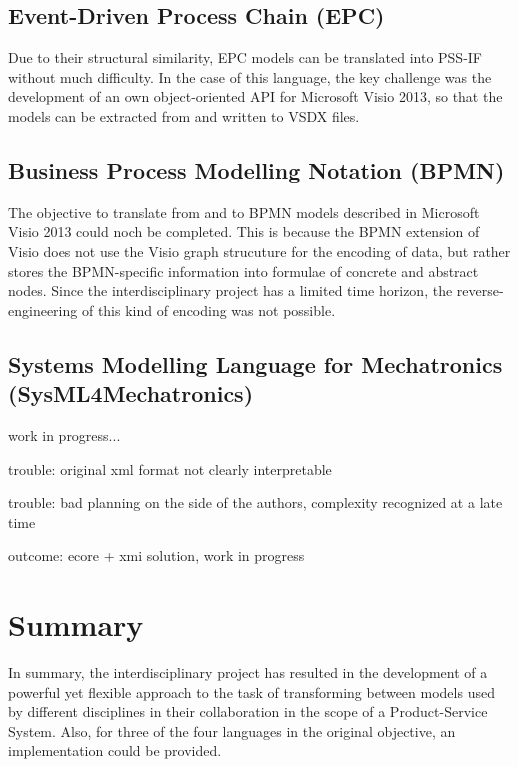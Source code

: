\subsection{Event-Driven Process Chain (EPC)}

Due to their structural similarity, EPC models can be translated into PSS-IF without much difficulty. In the case of this language, the key challenge was the development of an own object-oriented API for Microsoft Visio 2013, so that the models can be extracted from and written to VSDX files.

\subsection{Business Process Modelling Notation (BPMN)}

The objective to translate from and to BPMN models described in Microsoft Visio 2013 could noch be completed. This is because the BPMN extension of Visio does not use the Visio graph strucuture for the encoding of data, but rather stores the BPMN-specific information into formulae of concrete and abstract nodes. Since the interdisciplinary project has a limited time horizon, the reverse-engineering of this kind of encoding was not possible. 

\subsection{Systems Modelling Language for Mechatronics (SysML4Mechatronics)}

\color{red} work in progress...\color{black}

trouble: original xml format not clearly interpretable

trouble: bad planning on the side of the authors, complexity recognized at a late time

outcome: ecore + xmi solution, \color{red}work in progress\color{black}

\section{Summary}
\label{sec:results:summary}

In summary, the interdisciplinary project has resulted in the development of a powerful yet flexible approach to the task of transforming between models used by different disciplines in their collaboration in the scope of a Product-Service System. Also, for three of the four languages in the original objective, an implementation could be provided.
